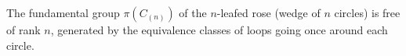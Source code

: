 The fundamental group $\pi(C_{(n)})$ of the $n$-leafed rose (wedge of $n$ circles) is free of rank $n$, generated by the equivalence classes of loops going once around each circle.
